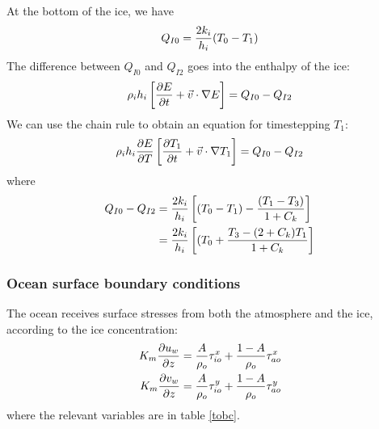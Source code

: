 At the bottom of the ice, we have
\begin{equation}
  Q_{I0} = {2 k_i \over h_i} (T_0 - T_1)
\end{equation}
The difference between $Q_{I0}$ and $Q_{I2}$ goes into the enthalpy of
the ice:
\begin{equation}
   \rho_i h_i \left[ {\partial E \over \partial t} + \vec{v} \cdot 
   \nabla E \right] = Q_{I0} - Q_{I2}
\end{equation}
We can use the chain rule to obtain an equation for timestepping $T_1$:
\begin{equation}
   \rho_i h_i {\partial E \over \partial T}
   \left[ {\partial T_1 \over \partial t} + \vec{v} \cdot 
   \nabla T_1 \right] = Q_{I0} - Q_{I2}
\end{equation}
where
\begin{align*}
  Q_{I0} - Q_{I2} & = {2 k_i \over h_i} \left[ (T_0 - T_1) - 
  {(T_1 - T_3) \over 1 + C_k} \right] \\
	          & = {2 k_i \over h_i} \left[ (T_0 +
  {T_3 - (2 + C_k) T_1 \over 1 + C_k} \right]
\end{align*}

\subsubsection{Ocean surface boundary conditions}
The ocean receives surface stresses from both the atmosphere and the
ice, according to the ice concentration:
\begin{align}
   K_m {\partial u_w \over \partial z} & = {A \over \rho_o} \tau_{io}^x
    + {1-A \over \rho_o} \tau_{ao}^x \\
   K_m {\partial v_w \over \partial z} & = {A \over \rho_o} \tau_{io}^y
    + {1-A \over \rho_o} \tau_{ao}^y
\end{align}
where the relevant variables are in table \ref{tobc}.

